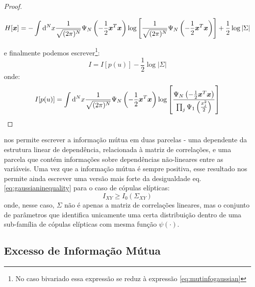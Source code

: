\begin{proof}
\begin{fullwidth}
\[
H[\bm{x}] = - \int \mathrm{d}^N x \frac{1}{\sqrt{(2\pi)^N}} \Psi_{N}\left(-\frac{1}{2} \bm{x}^{T}\bm{x}\right) \log\left[\frac{1}{\sqrt{(2\pi)^N}} \Psi_{N}\left(-\frac{1}{2} \bm{x}^{T}\bm{x}\right)\right] + \frac{1}{2}\log|\Sigma|
\]
\end{fullwidth}
\newpage
e finalmente podemos escrever\footnote{No caso bivariado essa expressão se reduz à expressão \ref{eq:mutinfogaussian}}:
\begin{equation}
I = I[p(u)] - \frac{1}{2}\log|\Sigma|
\end{equation}
onde:
\begin{equation}
\label{eq:excesselliptical}
I[p(u)] = \int \ud^N x \frac{1}{\sqrt{(2\pi)^N}} \Psi_{N}\left(-\frac{1}{2} \vec{x}^{T}\vec{x}\right) \log\left[\frac{\Psi_{N}\left(-\frac{1}{2} \vec{x}^{T}\vec{x}\right)}{\prod_j \Psi_{1}\left(\frac{x_j^2}{2}\right)}\right]
\end{equation}
\end{proof}

 nos permite escrever a informação mútua em duas parcelas - uma dependente da estrutura linear de dependência, relacionada à matriz de correlações, e uma parcela que contém informações sobre dependências não-lineares entre as variáveis. Uma vez que a informação mútua é sempre positiva, esse resultado nos permite ainda escrever uma versão mais forte da desigualdade eq.\eqref{eq:gaussianinequality} para o caso de cópulas elípticas:
\begin{equation}
\label{eq:gaussianineqgen}
 I_{XY} \ge I_{0}(\Sigma_{XY})
\end{equation}
onde, nesse caso, $\Sigma$ não é apenas a matriz de correlações lineares, mas o conjunto de parâmetros que identifica unicamente uma certa distribuição dentro de uma sub-família de cópulas elípticas com mesma função $\psi(\cdot)$.

\subsection{Excesso de Informação Mútua}

